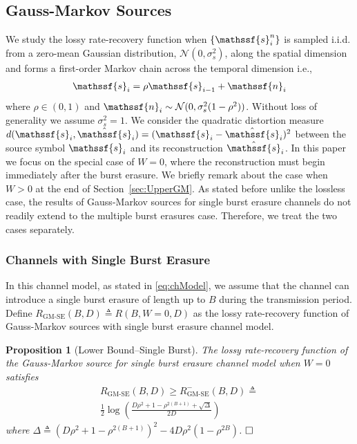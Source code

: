 \documentclass[journal, twocolumn, 10pt]{IEEEtran}
\newtheorem{prop}{Proposition}
\newcommand{\rvn}{{\mathssf{n}}}    %
\newcommand{\rvs}{{\mathssf{s}}}    %
\begin{document}
\subsection{Gauss-Markov Sources}
\label{sec:GMS}
We study the lossy rate-recovery function when  $\{\rvs_{i}^n\}$  is sampled i.i.d. from a zero-mean Gaussian distribution, $\mathcal{N}(0,\sigma^2_{s})$,  along the spatial dimension and forms a first-order Markov chain across the temporal dimension  i.e., 
\begin{align}
\rvs_{i} = \rho \rvs_{i-1} + \rvn_{i} \label{eq:GM-Def}
\end{align} where $\rho \in (0,1)$ and $\rvn_{i} \sim \mathcal{N}(0,\sigma^{2}_{s}(1-\rho^2))$. Without loss of generality we assume $\sigma^2_{s} = 1$. We  consider the quadratic distortion measure $d(\rvs_{i}, \hat{\rvs}_{i}) = (\rvs_{i} -\hat{\rvs}_{i})^2$ between the source symbol $\rvs_{i}$ and its reconstruction $\hat{\rvs}_{i}$.
In this paper we  focus on the special case of $W=0$, where the reconstruction must begin immediately after the burst erasure.  We briefly remark about the case when $W>0$ at the end of Section~\ref{sec:UpperGM}.
As stated before unlike the lossless case, the results of Gauss-Markov sources for single burst erasure channels do not readily extend to the multiple burst erasures case.  Therefore, we treat the two cases separately.         

\subsubsection{Channels with Single Burst Erasure}
\label{sec:GMS_SE}
In this channel model, as stated in \eqref{eq:chModel}, we assume that  the channel can introduce a single burst erasure of length up to $B$ during the transmission period. Define ${R_{\textrm{GM-SE}}(B,D)} \triangleq {R(B, W=0,D)}$ as the lossy rate-recovery function of Gauss-Markov sources with single burst erasure channel model. 
\begin{prop}[Lower Bound--Single Burst]
\label{prop:GML}
The lossy rate-recovery function of the Gauss-Markov source for single burst erasure channel model when $W=0$ satisfies
\begin{multline}
R_{\textrm{GM-SE}}(B,D) \ge R^{-}_{\textrm{GM-SE}}(B,D) \triangleq \\ \frac{1}{2}   \log \left( \frac{D\rho^2+1-\rho^{2(B+1)} + \sqrt{\Delta}}{2D}\right) \label{eq:thm-1}
\end{multline} where $\Delta \triangleq (D\rho^2+1-\rho^{2(B+1)})^2 - 4D\rho^2(1-\rho^{2B})$.
$\hfill\Box$
\end{prop}
\end{document}
